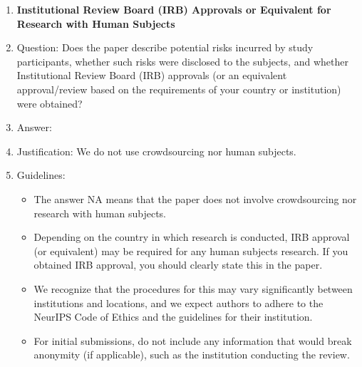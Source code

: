 \documentclass{article}
\begin{document}
\begin{enumerate}
\item {\bf Institutional Review Board (IRB) Approvals or Equivalent for Research with Human Subjects}
    \item[] Question: Does the paper describe potential risks incurred by study participants, whether such risks were disclosed to the subjects, and whether Institutional Review Board (IRB) approvals (or an equivalent approval/review based on the requirements of your country or institution) were obtained?
    \item[] Answer: \answerNA{} %
    \item[] Justification: We do not use crowdsourcing nor human subjects.
    \item[] Guidelines:
    \begin{itemize}
        \item The answer NA means that the paper does not involve crowdsourcing nor research with human subjects.
        \item Depending on the country in which research is conducted, IRB approval (or equivalent) may be required for any human subjects research. If you obtained IRB approval, you should clearly state this in the paper. 
        \item We recognize that the procedures for this may vary significantly between institutions and locations, and we expect authors to adhere to the NeurIPS Code of Ethics and the guidelines for their institution. 
        \item For initial submissions, do not include any information that would break anonymity (if applicable), such as the institution conducting the review.
    \end{itemize}

\end{enumerate}
\end{document}
